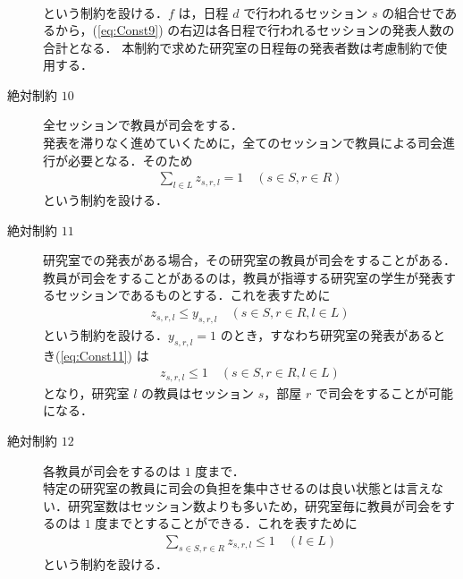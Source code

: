 \documentclass[a4paper,12pt,fleqn]{jarticle}
\begin{document}
\begin{description}
\begin{eqnarray}
  \end{eqnarray}
  という制約を設ける．$f$ は，日程 $d$ で行われるセッション $s$ の組合せであるから，(\ref{eq:Const9}) の右辺は各日程で行われるセッションの発表人数の合計となる．
  本制約で求めた研究室の日程毎の発表者数は考慮制約で使用する．
\item[絶対制約 $10$] 全セッションで教員が司会をする．\\発表を滞りなく進めていくために，全てのセッションで教員による司会進行が必要となる．そのため
  \begin{eqnarray}\sum_{l \in L} z_{s,r,l} = 1 \quad (s \in S, r \in R)
  \end{eqnarray}
  という制約を設ける．
\item[絶対制約 $11$] 研究室での発表がある場合，その研究室の教員が司会をすることがある．\\教員が司会をすることがあるのは，教員が指導する研究室の学生が発表するセッションであるものとする．これを表すために
  \begin{eqnarray}z_{s,r,l} \leq y_{s,r,l} \quad (s \in S, r \in R, l \in L) \label{eq:Const11}
  \end{eqnarray}
  という制約を設ける．$y_{s,r,l}=1$ のとき，すなわち研究室の発表があるとき(\ref{eq:Const11}) は
  \begin{eqnarray*}
    z_{s,r,l} \leq 1 \quad (s \in S, r \in R, l \in L)
  \end{eqnarray*}
  となり，研究室 $l$ の教員はセッション $s$，部屋 $r$ で司会をすることが可能になる．
\item[絶対制約 $12$] 各教員が司会をするのは $1$ 度まで．\\特定の研究室の教員に司会の負担を集中させるのは良い状態とは言えない．研究室数はセッション数よりも多いため，研究室毎に教員が司会をするのは $1$ 度までとすることができる．これを表すために
  \begin{eqnarray}
    \sum_{s \in S, r \in R} z_{s,r,l} \leq 1 \quad (l \in L)
  \end{eqnarray}
  という制約を設ける．


\end{description}
\end{document}

